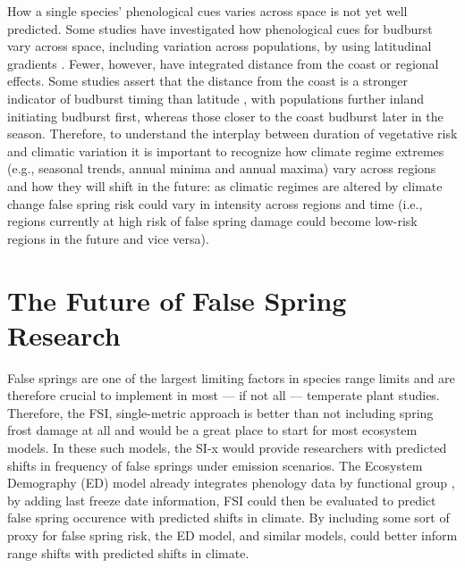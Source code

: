 \documentclass{article}\usepackage[]{graphicx}\usepackage[]{color}
\begin{document}
How a single species' phenological cues varies across space is not yet well predicted. Some studies have investigated how phenological cues for budburst vary across space, including variation across populations, by using latitudinal gradients \citep{Gauzere2017, Sogaard2008, Way2015, Zohner2016}. Fewer, however, have integrated distance from the coast \citep [but see][]{Aitken2015, Harrington2015, Myking2007} or regional effects. Some studies assert that the distance from the coast is a stronger indicator of budburst timing than latitude \citep{Myking2007}, with populations further inland initiating budburst first, whereas those closer to the coast budburst later in the season. Therefore, to understand the interplay between duration of vegetative risk and climatic variation it is important to recognize how climate regime extremes (e.g., seasonal trends, annual minima and annual maxima) vary across regions and how they will shift in the future: as climatic regimes are altered by climate change false spring risk could vary in intensity across regions and time (i.e., regions currently at high risk of false spring damage could become low-risk regions in the future and vice versa). 

\section*{The Future of False Spring Research}

False springs are one of the largest limiting factors in species range limits \citep{Sakai1987} and are therefore crucial to implement in most --- if not all --- temperate plant studies. Therefore, the FSI, single-metric approach is better than not including spring frost damage at all and would be a great place to start for most ecosystem models. In these such models, the SI-x would provide researchers with predicted shifts in frequency of false springs under emission scenarios. The Ecosystem Demography (ED) model already integrates phenology data by functional group \citep{Kim2015, Moorcroft2001}, by adding last freeze date information, FSI could then be evaluated to predict false spring occurence with predicted shifts in climate. By including some sort of proxy for false spring risk, the ED model, and similar models, could better inform range shifts with predicted shifts in climate. 

\end{document}
